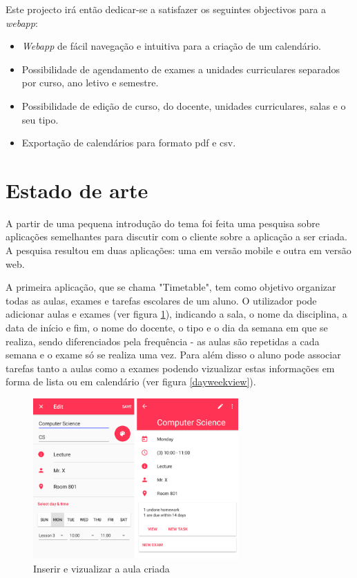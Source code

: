 \documentclass[11pt, twoside]{report}
\begin{document}
	Este projecto irá então dedicar-se a satisfazer os seguintes objectivos para a \textit{webapp}: 
	\begin{itemize} 
		\item \textit{Webapp} de fácil navegação e intuitiva para a criação de um calendário. 
		\item Possibilidade de agendamento de exames a unidades curriculares separados por curso, ano letivo e semestre.   
		\item Possibilidade de edição de curso, do docente, unidades curriculares, salas e o seu tipo. 
		\item Exportação de calendários para formato pdf e csv. 
	\end{itemize} 
	\section{Estado de arte}
	
	A partir de uma pequena introdução do tema foi feita uma pesquisa sobre aplicações semelhantes para discutir com o cliente sobre a aplicação a ser criada. A pesquisa resultou em duas aplicações: uma em versão mobile e outra em versão web.
	
	A primeira aplicação, que se chama "Timetable", tem como objetivo organizar todas as aulas, exames e tarefas escolares de um aluno. O utilizador pode adicionar aulas e exames (ver figura \ref{inserirvizualizaraula}), indicando a sala, o nome da disciplina, a data de início e fim, o nome do docente, o tipo e o dia da semana em que se realiza, sendo diferenciados pela frequência - as aulas são repetidas a cada semana e o exame só se realiza uma vez. Para além disso o aluno pode associar tarefas tanto a aulas como a exames podendo vizualizar estas informações em forma de lista ou em calendário (ver figura \ref{dayweekview}).
		\begin{figure}[H] 
		\centering 
		\includegraphics[width=0.7\textwidth,height=0.7\textheight,keepaspectratio]{image/estadodearte/inserirevizualizar}
		\caption{Inserir e vizualizar a aula criada}
		\label{inserirvizualizaraula}
	\end{figure}
\end{document}
